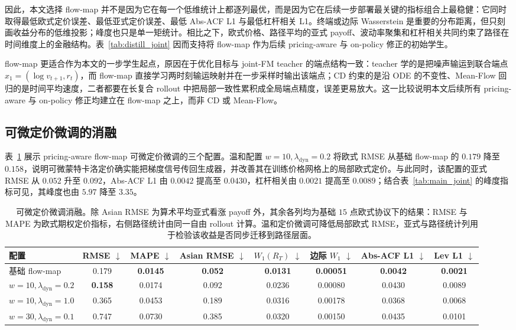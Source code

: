 \documentclass[11pt]{ctexart}
\newcommand{\tablebodysetup}{\footnotesize\setlength{\tabcolsep}{2pt}\renewcommand{\arraystretch}{1.12}}
\newcommand{\best}[1]{\textbf{#1}}
\begin{document}
因此，本文选择 flow-map 并不是因为它在每一个低维统计上都逐列最优，而是因为它在后续一步部署最关键的指标组合上最稳健：它同时取得最低欧式定价误差、最低亚式定价误差、最低 Abs-ACF L1 与最低杠杆相关 L1。终端或边际 Wasserstein 是重要的分布距离，但只刻画收益分布的低维投影；峰度也只是单一矩统计。相比之下，欧式价格、路径平均的亚式 payoff、波动率聚集和杠杆相关共同约束了路径在时间维度上的金融结构。表~\ref{tab:distill_joint} 因而支持将 flow-map 作为后续 pricing-aware 与 on-policy 修正的初始学生。

flow-map 更适合作为本文的一步学生起点，原因在于优化目标与 joint-FM teacher 的端点结构一致：teacher 学的是把噪声输运到联合端点 $x_1=(\log v_{t+1},r_t)$，而 flow-map 直接学习两时刻输运映射并在一步采样时输出该端点；CD 约束的是沿 ODE 的不变性、Mean-Flow 回归的是时间平均速度，二者都要在长复合 rollout 中把局部一致性累积成全局端点精度，误差更易放大。这一比较说明本文后续所有 pricing-aware 与 on-policy 修正均建立在 flow-map 之上，而非 CD 或 Mean-Flow。

\subsection{可微定价微调的消融}
\label{sec:res_pricing}
表~\ref{tab:pricing} 展示 pricing-aware flow-map 可微定价微调的三个配置。温和配置 $w{=}10,\lambda_{\mathrm{dyn}}{=}0.2$ 将欧式 RMSE 从基础 flow-map 的 $0.179$ 降至 $0.158$，说明可微蒙特卡洛定价确实能把梯度信号传回生成器，并改善其在训练价格网格上的局部欧式定价。与此同时，该配置的亚式 RMSE 从 $0.052$ 升至 $0.092$，Abs-ACF L1 由 $0.0042$ 提高至 $0.0430$，杠杆相关由 $0.0021$ 提高至 $0.0089$；结合表~\ref{tab:main_joint} 的峰度指标可见，其峰度也由 $5.97$ 降至 $3.35$。

\begin{table}[htbp]
\centering
\caption{可微定价微调消融。除 Asian RMSE 为算术平均亚式看涨 payoff 外，其余各列均为基础 $15$ 点欧式协议下的结果：RMSE 与 MAPE 为欧式期权定价指标，右侧路径统计由同一自由 rollout 计算。温和定价微调可降低局部欧式 RMSE，亚式与路径统计列用于检验该收益是否同步迁移到路径层面。}
\label{tab:pricing}
\tablebodysetup
\begin{tabular}{l c c c c c c c}
\toprule
配置 & RMSE $\downarrow$ & MAPE $\downarrow$ & Asian RMSE $\downarrow$ & $W_1(R_T)$ $\downarrow$ & 边际 $W_1$ $\downarrow$ & Abs-ACF L1 $\downarrow$ & Lev L1 $\downarrow$ \\
\midrule
基础 flow-map & 0.179 & \best{0.0145} & \best{0.052} & \best{0.0131} & \best{0.00051} & \best{0.0042} & \best{0.0021} \\
$w{=}10,\lambda_{\mathrm{dyn}}{=}0.2$ & \best{0.158} & 0.0174 & 0.092 & 0.0236 & 0.00080 & 0.0430 & 0.0089 \\
$w{=}10,\lambda_{\mathrm{dyn}}{=}1.0$ & 0.365 & 0.0453 & 0.189 & 0.0316 & 0.00178 & 0.0368 & 0.0068 \\
$w{=}30,\lambda_{\mathrm{dyn}}{=}0.1$ & 0.747 & 0.0730 & 0.385 & 0.0320 & 0.00150 & 0.0435 & 0.0101 \\
\bottomrule
\end{tabular}
\end{table}
\end{document}
